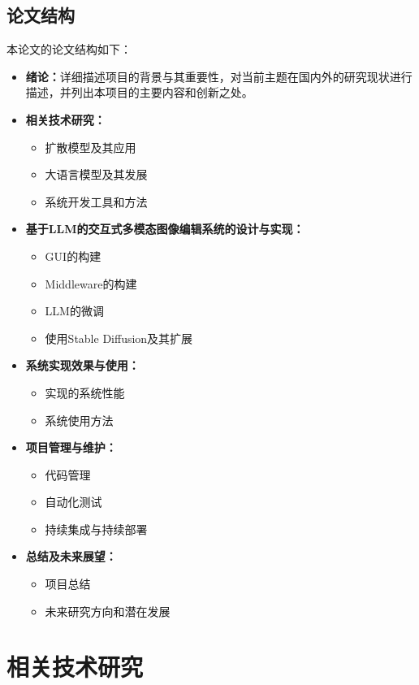 \documentclass[a4paper,AutoFakeBold,oneside,12pt]{book}
\begin{document}
\section{论文结构}
本论文的论文结构如下：
\begin{itemize}
    \item \textbf{绪论：}详细描述项目的背景与其重要性，对当前主题在国内外的研究现状进行描述，并列出本项目的主要内容和创新之处。
    \item \textbf{相关技术研究：}
    \begin{itemize}
        \item 扩散模型及其应用
        \item 大语言模型及其发展
        \item 系统开发工具和方法
    \end{itemize}
    \item \textbf{基于LLM的交互式多模态图像编辑系统的设计与实现：}
    \begin{itemize}
        \item GUI的构建
        \item Middleware的构建
        \item LLM的微调
        \item 使用Stable Diffusion及其扩展
    \end{itemize}
    \item \textbf{系统实现效果与使用：}
    \begin{itemize}
        \item 实现的系统性能
        \item 系统使用方法
    \end{itemize}
    \item \textbf{项目管理与维护：}
    \begin{itemize}
        \item 代码管理
        \item 自动化测试
        \item 持续集成与持续部署
    \end{itemize}
    \item \textbf{总结及未来展望：}
    \begin{itemize}
        \item 项目总结
        \item 未来研究方向和潜在发展
    \end{itemize}
\end{itemize}

\chapter{相关技术研究}
\end{document}
